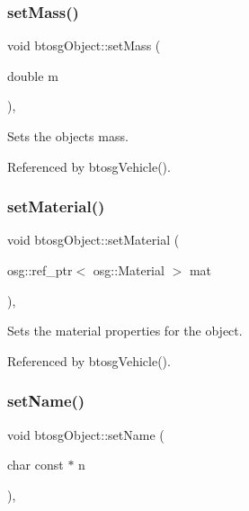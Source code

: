 \subsubsection{\texorpdfstring{set\+Mass()}{setMass()}}
{\footnotesize\ttfamily void btosg\+Object\+::set\+Mass (\begin{DoxyParamCaption}\item[{double}]{m }\end{DoxyParamCaption})\hspace{0.3cm}{\ttfamily [inline]}, {\ttfamily [inherited]}}

Sets the object\textquotesingle{}s mass. 

Referenced by btosg\+Vehicle().

\mbox{\label{classbtosgObject_a6ab7b9e0553dab398b980637788b56a8}} 
\subsubsection{\texorpdfstring{set\+Material()}{setMaterial()}}
{\footnotesize\ttfamily void btosg\+Object\+::set\+Material (\begin{DoxyParamCaption}\item[{osg\+::ref\+\_\+ptr$<$ osg\+::\+Material $>$}]{mat }\end{DoxyParamCaption})\hspace{0.3cm}{\ttfamily [inline]}, {\ttfamily [inherited]}}

Sets the material properties for the object. 

Referenced by btosg\+Vehicle().

\mbox{\label{classbtosgObject_ab06a1b3f357209214c6440cd5746523e}} 
\subsubsection{\texorpdfstring{set\+Name()}{setName()}}
{\footnotesize\ttfamily void btosg\+Object\+::set\+Name (\begin{DoxyParamCaption}\item[{char const $\ast$}]{n }\end{DoxyParamCaption})\hspace{0.3cm}{\ttfamily [inline]}, {\ttfamily [inherited]}}

